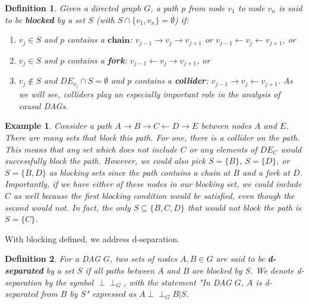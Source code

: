 \documentclass[12pt,twoside]{reedthesis}
\newtheorem{example}{Example}
\newtheorem{definition}{Definition}[section]
\theoremstyle{definition}
\newcommand{\dsep}{\perp \!\!\!\perp}
\begin{document}
\begin{definition}
Given a directed graph $G$, a path $p$ from node $v_1$ to node $v_n$ is said to be \textbf{\emph{blocked}} by a set $S$ (with $S \cap \{v_1, v_n\} = \emptyset$) if:
\begin{enumerate}
\item $v_j \in S$ and $p$ contains a $\mathbf{chain}$: $v_{j-1} \rightarrow v_j \rightarrow v_{j+1}$ or $v_{j-1} \leftarrow v_j \leftarrow v_{j+1}$, or

\item $v_j \in S$ and $p$ contains a \textbf{\emph{fork}}: $v_{j-1} \leftarrow v_j \rightarrow v_{j+1}$, or

\item $v_j \notin S$ and $DE_{v_j} \cap S = \emptyset$ and $p$ contains a \textbf{\emph{collider}}: $v_{j-1} \rightarrow v_j \leftarrow v_{j+1}$. As we will see, colliders play an especially important role in the analysis of causal DAGs.
\end{enumerate}
\end{definition}

\begin{example}
Consider a path $A \rightarrow B \rightarrow C \leftarrow D \rightarrow E$ between nodes $A$ and $E$. There are many sets that block this path. For one, there is a collider on the path. This means that any set which does not include $C$ or any elements of $DE_C$ would successfully block the path. However, we could also pick $S = \{B\}$, $S= \{D\}$, or $S = \{B,D\}$ as blocking sets since the path contains a chain at $B$ and a  fork at $D$. Importantly, if we have either of these nodes in our blocking set, we could include $C$ as well because the first blocking condition would be satisfied, even though the second would not. In fact, the only $S \subseteq \{B,C,D\}$ that would not block the path is $S = \{C\}$.
\end{example}

With blocking defined, we address d-separation. 

\begin{definition}
For a DAG $G$, two sets of nodes $A,B \in G$ are said to be  \textbf{\emph{d-separated}} by a set $S$ if all paths between $A$ and $B$ are blocked by $S$. We denote d-separation by the symbol $\perp \!\!\!\perp_G$, with the statement "In DAG $G$, $A$ is d-separated from $B$ by $S$" expressed as $A \dsep_G B | S$. 
\end{definition}
\end{document}
